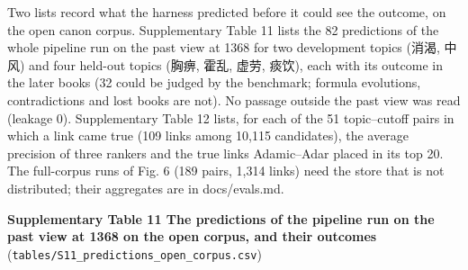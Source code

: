\documentclass[
]{article}
\begin{document}
Two lists record what the harness predicted before it could see the
outcome, on the open canon corpus. Supplementary Table 11 lists the 82
predictions of the whole pipeline run on the past view at 1368 for two
development topics (消渴, 中风) and four held-out topics (胸痹, 霍乱,
虚劳, 痰饮), each with its outcome in the later books (32 could be
judged by the benchmark; formula evolutions, contradictions and lost
books are not). No passage outside the past view was read (leakage 0).
Supplementary Table 12 lists, for each of the 51 topic--cutoff pairs in
which a link came true (109 links among 10,115 candidates), the average
precision of three rankers and the true links Adamic--Adar placed in its
top 20. The full-corpus runs of Fig. 6 (189 pairs, 1,314 links) need the
store that is not distributed; their aggregates are in docs/evals.md.

\textbf{Supplementary Table 11 \textbar{} The predictions of the
pipeline run on the past view at 1368 on the open corpus, and their
outcomes} (\texttt{tables/S11\_predictions\_open\_corpus.csv})
\end{document}
